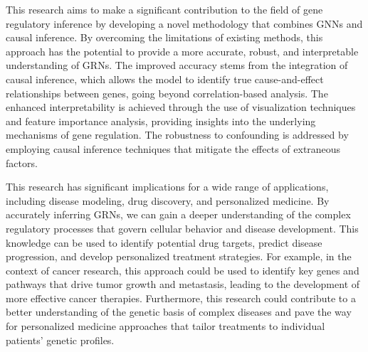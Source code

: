 
This research aims to make a significant contribution to the field of gene regulatory inference by developing a novel methodology that combines GNNs and causal inference. By overcoming the limitations of existing methods, this approach has the potential to provide a more accurate, robust, and interpretable understanding of GRNs. The improved accuracy stems from the integration of causal inference, which allows the model to identify true cause-and-effect relationships between genes, going beyond correlation-based analysis. The enhanced interpretability is achieved through the use of visualization techniques and feature importance analysis, providing insights into the underlying mechanisms of gene regulation. The robustness to confounding is addressed by employing causal inference techniques that mitigate the effects of extraneous factors.

This research has significant implications for a wide range of applications, including disease modeling, drug discovery, and personalized medicine. By accurately inferring GRNs, we can gain a deeper understanding of the complex regulatory processes that govern cellular behavior and disease development. This knowledge can be used to identify potential drug targets, predict disease progression, and develop personalized treatment strategies. For example, in the context of cancer research, this approach could be used to identify key genes and pathways that drive tumor growth and metastasis, leading to the development of more effective cancer therapies. Furthermore, this research could contribute to a better understanding of the genetic basis of complex diseases and pave the way for personalized medicine approaches that tailor treatments to individual patients' genetic profiles.
